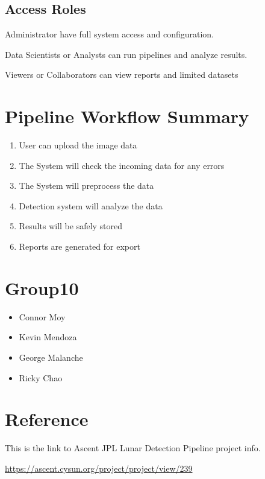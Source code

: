 \documentclass[12pt]{article}
\begin{document}
\subsection{Access Roles}


Administrator have full system access and configuration.

Data Scientists  or Analysts can run pipelines and analyze results.

Viewers or Collaborators can view reports and limited datasets 

\section{Pipeline Workflow Summary}

\begin{enumerate}
    \item User can upload the image data
    \item The System will check the incoming data for any errors
    \item The System will preprocess the data
    \item Detection system will analyze the data
    \item Results will be safely stored 
    \item Reports are generated for export
\end{enumerate}


\section{Group10}

\begin{itemize}
    \item Connor Moy
    \item Kevin Mendoza
    \item George Malanche
    \item Ricky Chao
\end{itemize}

\section{Reference}
This is the link to Ascent JPL Lunar Detection Pipeline project info.

\url{https://ascent.cysun.org/project/project/view/239}
\end{document}
